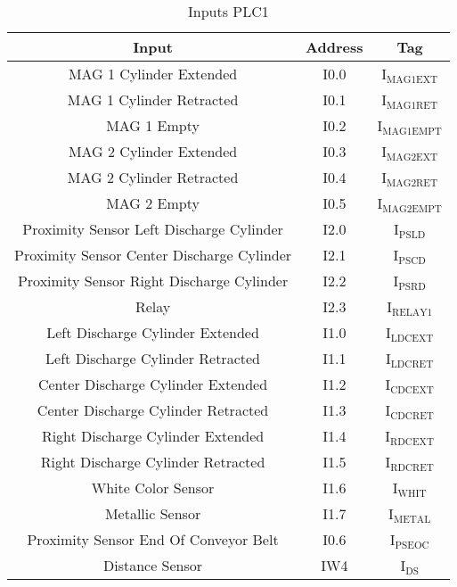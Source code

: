 \begin{table}[htbp]
\caption{Inputs PLC1}
\centering
\begin{tabular}{c|c|c}
Input & Address & Tag\\
\hline
MAG 1 Cylinder Extended & I0.0 & I\(_{\text{MAG1EXT}}\)\\
MAG 1 Cylinder Retracted & I0.1 & I\(_{\text{MAG1RET}}\)\\
MAG 1 Empty & I0.2 & I\(_{\text{MAG1EMPT}}\)\\
MAG 2 Cylinder Extended & I0.3 & I\(_{\text{MAG2EXT}}\)\\
MAG 2 Cylinder Retracted & I0.4 & I\(_{\text{MAG2RET}}\)\\
MAG 2 Empty & I0.5 & I\(_{\text{MAG2EMPT}}\)\\
Proximity Sensor Left Discharge Cylinder & I2.0 & I\(_{\text{PSLD}}\)\\
Proximity Sensor Center Discharge Cylinder & I2.1 & I\(_{\text{PSCD}}\)\\
Proximity Sensor Right Discharge Cylinder & I2.2 & I\(_{\text{PSRD}}\)\\
Relay & I2.3 & I\(_{\text{RELAY1}}\)\\
Left Discharge Cylinder Extended & I1.0 & I\(_{\text{LDCEXT}}\)\\
Left Discharge Cylinder Retracted & I1.1 & I\(_{\text{LDCRET}}\)\\
Center Discharge Cylinder Extended & I1.2 & I\(_{\text{CDCEXT}}\)\\
Center Discharge Cylinder Retracted & I1.3 & I\(_{\text{CDCRET}}\)\\
Right Discharge Cylinder Extended & I1.4 & I\(_{\text{RDCEXT}}\)\\
Right Discharge Cylinder Retracted & I1.5 & I\(_{\text{RDCRET}}\)\\
White Color Sensor & I1.6 & I\(_{\text{WHIT}}\)\\
Metallic Sensor & I1.7 & I\(_{\text{METAL}}\)\\
Proximity Sensor End Of Conveyor Belt & I0.6 & I\(_{\text{PSEOC}}\)\\
Distance Sensor & IW4 & I\(_{\text{DS}}\)\\
\end{tabular}
\end{table}

